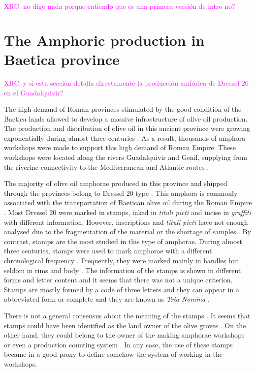 \documentclass[review]{elsarticle}
\newcommand{\memo}[2]{\textcolor{#1}{#2}}
\newcommand{\xavi}[1]{\memo{magenta}{XRC: #1\\}}
\begin{document}

\xavi{no digo nada porque entiendo que es una primera versión de intro no?}

\section{The Amphoric production in Baetica province}

\xavi{y si esta sección detalla directamente la producción amfórica de Dressel 20 en el Guadalquivir?}

The high demand of Roman provinces stimulated by the good condition of the Baetica lands allowed to develop a massive infrastructure of olive oil production. The production and distribution of olive oil in this ancient province were growing exponentially during almost three centuries \citep{remesal_concierto}. As a result, thousands of amphora workshops were made to support this high demand of Roman Empire. These workshops were located along the rivers Guadalquivir and Genil, supplying from the riverine connectivity to the Mediterranean and Atlantic routes \citep{garcia_vargas_enrique_formal_2010}.

The majority of olive oil amphorae produced in this province and shipped through the provinces belong to Dressel 20 type \citep{dressel,martin-kilcher_romischen_1994}. This amphora is commonly associated with the transportation of Baetican olive oil during the Roman Empire \citep{berni_millet_epigrafianforica_2008}. Most Dressel 20 were marked in stamps, inked in \textit{tituli picti} and incise in \textit{graffiti} with different information. However, inscriptions and \textit{tituli picti} have not enough analysed due to the fragmentation of the material or the shortage of samples \citep{aguilera_evolucion_2007,rovira_guardiola_grafitos_2007}. By contrast, stamps are the most studied in this type of amphorae. During almost three centuries, stamps were used to mark amphorae with a different chronological frequency \citep{remesal_sellar_2016}. Frequently, they were marked mainly in handles but seldom in rims and body \citep{millet_anforas_1998}. 
The information of the stamps is shown in different forms and letter content and it seems that there was not a unique criterion. Stamps are mostly formed by a code of three letters and they can appear in a abbreviated form or complete and they are known as \textit{Tria Nomina} \citep{berni_millet_amphora_1996}. 

 There is not a general consensus about the meaning of the stamps \citep{rodriguez_baetican_1998}. It seems that stamps could have been identified as the land owner of the olive groves \citep{rodriguez_economioleicola_1977}. On the other hand, they could belong to the owner of the making amphorae workshops or even a production counting system  \citep{berni_millet_epigrafianforica_2008}. In any case, the use of these stamps became in a good proxy to define somehow the system of working in the workshops. 
\end{document}
